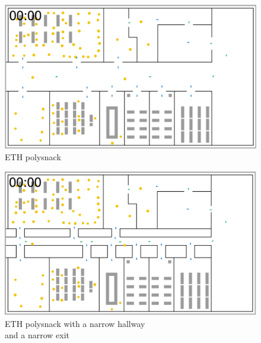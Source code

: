 \documentclass[11pt]{article}
\begin{document}
\begin{minipage}{.5\textwidth}
	\begin{figure}[H]
		\centering
		\includegraphics[width=.9\linewidth]{assets/polysnack}\\
		ETH polysnack
	\end{figure}
\end{minipage}
\begin{minipage}{.5\textwidth}
	\begin{figure}[H]
	\centering
	\includegraphics[width=.9\linewidth]{assets/polysnack-modified}\\
	ETH polysnack with a narrow hallway\\
	and a narrow exit
\end{figure}
\end{minipage}
\end{document}
